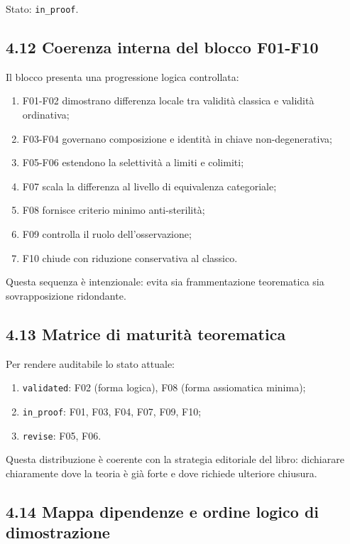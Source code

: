 Stato: \texttt{in\_proof}.

\subsection{4.12 Coerenza interna del blocco F01-F10}

Il blocco presenta una progressione logica controllata:

\begin{enumerate}
\def\labelenumi{\arabic{enumi}.}
\tightlist
\item
  F01-F02 dimostrano differenza locale tra validità classica e validità ordinativa;
\item
  F03-F04 governano composizione e identità in chiave non-degenerativa;
\item
  F05-F06 estendono la selettività a limiti e colimiti;
\item
  F07 scala la differenza al livello di equivalenza categoriale;
\item
  F08 fornisce criterio minimo anti-sterilità;
\item
  F09 controlla il ruolo dell'osservazione;
\item
  F10 chiude con riduzione conservativa al classico.
\end{enumerate}

Questa sequenza è intenzionale: evita sia frammentazione teorematica sia sovrapposizione ridondante.

\subsection{4.13 Matrice di maturità teorematica}

Per rendere auditabile lo stato attuale:

\begin{enumerate}
\def\labelenumi{\arabic{enumi}.}
\tightlist
\item
  \texttt{validated}: F02 (forma logica), F08 (forma assiomatica minima);
\item
  \texttt{in\_proof}: F01, F03, F04, F07, F09, F10;
\item
  \texttt{revise}: F05, F06.
\end{enumerate}

Questa distribuzione è coerente con la strategia editoriale del libro: dichiarare chiaramente dove la teoria è già forte e dove richiede ulteriore chiusura.

\subsection{4.14 Mappa dipendenze e ordine logico di dimostrazione}

